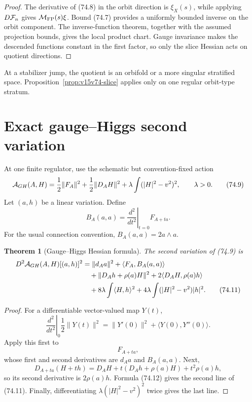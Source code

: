 \documentclass[11pt]{article}
\newtheorem{theorem}{Theorem}[section]
\theoremstyle{remark}
\begin{document}
\begin{proof}
The derivative of (74.8) in the orbit direction is
\(\xi_X(s)\), while applying \(D{\cal F}_n\) gives
\({\cal M}_{\rm FP}(s)\xi\).  Bound (74.7) provides a uniformly
bounded inverse on the orbit component.  The inverse-function
theorem, together with the assumed projection bounds, gives the
local product chart.  Gauge invariance makes the descended
functions constant in the first factor, so only the slice Hessian
acts on quotient directions.
\end{proof}

At a stabilizer jump, the quotient is an orbifold or a more
singular stratified space.  Proposition~\ref{prop:v15v74-slice}
applies only on one regular orbit-type stratum.

\section{Exact gauge--Higgs second variation}

At one finite regulator, use the schematic but convention-fixed
action
\[
 {\cal A}_{GH}(A,H)
 =
 \frac12\|F_A\|^2+
 \frac12\|D_AH\|^2+
 \lambda\int(|H|^2-v^2)^2,\qquad\lambda>0.             \tag{74.9}
\]
Let \((a,h)\) be a linear variation.  Define
\[
 B_A(a,a)=
 \left.\frac{d^2}{dt^2}\right|_{t=0}F_{A+ta}.          \tag{74.10}
\]
For the usual connection convention,
\(B_A(a,a)=2a\wedge a\).

\begin{theorem}[Gauge--Higgs Hessian formula]
\label{thm:v15v74-gh-hessian}
The second variation of (74.9) is
\[
\begin{split}
 D^2{\cal A}_{GH}(A,H)[(a,h)]^2
 &=
 \|d_Aa\|^2+\langle F_A,B_A(a,a)\rangle\\
 &\quad+
 \|D_Ah+\rho(a)H\|^2
 +2\langle D_AH,\rho(a)h\rangle\\
 &\quad+
 8\lambda\int\langle H,h\rangle^2
 +4\lambda\int(|H|^2-v^2)|h|^2.                      \tag{74.11}
\end{split}
\]
\end{theorem}

\begin{proof}
For a differentiable vector-valued map \(Y(t)\),
\[
 \left.\frac{d^2}{dt^2}\right|_0\frac12\|Y(t)\|^2
 =
 \|Y'(0)\|^2+\langle Y(0),Y''(0)\rangle.               \tag{74.12}
\]
Apply this first to
\[
 F_{A+ta},
\]
whose first and second derivatives are \(d_Aa\) and
\(B_A(a,a)\).  Next,
\[
 D_{A+ta}(H+th)
 =
 D_AH+t(D_Ah+\rho(a)H)+t^2\rho(a)h,                  \tag{74.13}
\]
so its second derivative is \(2\rho(a)h\).  Formula (74.12) gives
the second line of (74.11).  Finally, differentiating
\(\lambda(|H|^2-v^2)^2\) twice gives the last line.
\end{proof}
\end{document}
